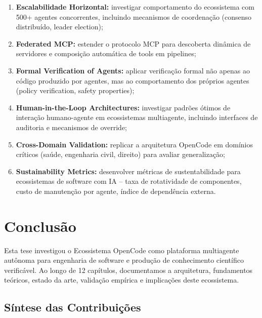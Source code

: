 \documentclass[12pt,a4paper,sumario=tradicional]{abntex2}
\begin{document}
\begin{enumerate}[leftmargin=*]
    \item \textbf{Escalabilidade Horizontal:} investigar comportamento do ecossistema com 500+ agentes concorrentes, incluindo mecanismos de coordenação (consenso distribuído, leader election);
    \item \textbf{Federated MCP:} estender o protocolo MCP para descoberta dinâmica de servidores e composição automática de tools em pipelines;
    \item \textbf{Formal Verification of Agents:} aplicar verificação formal não apenas ao código produzido por agentes, mas ao comportamento dos próprios agentes (policy verification, safety properties);
    \item \textbf{Human-in-the-Loop Architectures:} investigar padrões ótimos de interação humano-agente em ecossistemas multiagente, incluindo interfaces de auditoria e mecanismos de override;
    \item \textbf{Cross-Domain Validation:} replicar a arquitetura OpenCode em domínios críticos (saúde, engenharia civil, direito) para avaliar generalização;
    \item \textbf{Sustainability Metrics:} desenvolver métricas de sustentabilidade para ecossistemas de software com IA -- taxa de rotatividade de componentes, custo de manutenção por agente, índice de dependência externa.
\end{enumerate}

\chapter{Conclusão}

Esta tese investigou o Ecossistema OpenCode como plataforma multiagente autônoma para engenharia de software e produção de conhecimento científico verificável. Ao longo de 12 capítulos, documentamos a arquitetura, fundamentos teóricos, estado da arte, validação empírica e implicações deste ecossistema.

\section{Síntese das Contribuições}
\end{document}
